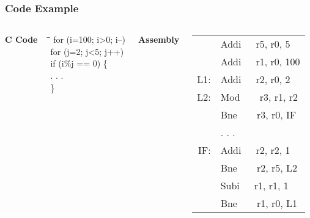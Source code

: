 \documentclass[aspectratio=169,12pt]{beamer}
\begin{document}
\begin{frame}
  \frametitle{Code Example}
  
  \begin{columns}[T]
    \centering
    \textbf{C Code}
    \vspace{0.5em}
    
    \begin{tcolorbox}[colback=white, colframe=black!60, boxrule=0.8pt, left=3pt, right=3pt, top=3pt, bottom=3pt]
      \small\ttfamily
      \begin{tabbing}
      \hspace{1em}\=\hspace{1em}\=\kill
      \colorbox{red!25}{for (i=100; i>0; i--)}\\ 
      \> \colorbox{green!25}{for (j=2; j<5; j++)}\\
      \> \> \colorbox{cyan!25}{if (i\%j == 0)} \{\\
      \> \>   \colorbox{gray!15}{. . .}\\
      \> \> \}\\
      \end{tabbing}
    \end{tcolorbox}
    
    \centering
    \textbf{Assembly}
    \vspace{0.5em}
    
    \begin{tcolorbox}[colback=white, colframe=black!60, boxrule=0.8pt, left=3pt, right=3pt, top=3pt, bottom=3pt]
      \small\ttfamily
      \renewcommand{\arraystretch}{1.1}
      \begin{tabular}{@{}r@{~~}l@{}}
        & \colorbox{green!25}{Addi~~~r5, r0, 5}\\
        & \colorbox{red!25}{Addi~~~r1, r0, 100}\\
        L1: & \colorbox{green!25}{Addi~~~r2, r0, 2}\\
        L2: & \colorbox{cyan!25}{Mod~~~~r3, r1, r2}\\
        & \colorbox{cyan!25}{Bne~~~~r3, r0, IF}\\
        & \colorbox{gray!15}{. . .}\\
        IF: & \colorbox{green!25}{Addi~~~r2, r2, 1}\\
        & \colorbox{green!25}{Bne~~~~r2, r5, L2}\\
        & \colorbox{red!25}{Subi~~~r1, r1, 1}\\
        & \colorbox{red!25}{Bne~~~~r1, r0, L1}\\
      \end{tabular}
    \end{tcolorbox}
  \end{columns}
  

\end{frame}
\end{document}
